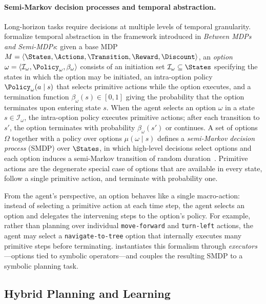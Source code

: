 \paragraph{Semi-Markov decision processes and temporal abstraction.}
Long-horizon tasks require decisions at multiple levels of temporal granularity. \citet{sutton1999options} formalize temporal abstraction in the framework introduced in \emph{Between MDPs and Semi-MDPs}: given a base MDP $M = \langle \States, \Actions, \Transition, \Reward, \Discount \rangle$, an \emph{option} $\omega = \langle \mathcal{I}_\omega, \Policy_\omega, \beta_\omega \rangle$ consists of an initiation set $\mathcal{I}_\omega \subseteq \States$ specifying the states in which the option may be initiated, an intra-option policy $\Policy_\omega(a \mid s)$ that selects primitive actions while the option executes, and a termination function $\beta_\omega(s) \in [0, 1]$ giving the probability that the option terminates upon entering state $s$. When the agent selects an option $\omega$ in a state $s \in \mathcal{I}_\omega$, the intra-option policy executes primitive actions; after each transition to $s'$, the option terminates with probability $\beta_\omega(s')$ or continues. A set of options $\Omega$ together with a policy over options $\mu(\omega \mid s)$ defines a \emph{semi-Markov decision process} (SMDP) over $\States$, in which high-level decisions select options and each option induces a semi-Markov transition of random duration~\citep{sutton1999options,sutton2018reinforcement}. Primitive actions are the degenerate special case of options that are available in every state, follow a single primitive action, and terminate with probability one.

From the agent's perspective, an option behaves like a single macro-action: instead of selecting a primitive action at each time step, the agent selects an option and delegates the intervening steps to the option's policy. For example, rather than planning over individual \texttt{move-forward} and \texttt{turn-left} actions, the agent may select a \texttt{navigate-to-tree} option that internally executes many primitive steps before terminating.  instantiates this formalism through \emph{executors}---options tied to symbolic operators---and couples the resulting SMDP to a symbolic planning task.
\subsection{Hybrid Planning and Learning}
\label{sec:hybrid}

